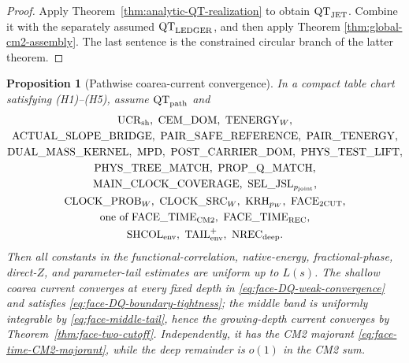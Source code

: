 \documentclass[11pt]{article}
\newtheorem{proposition}[theorem]{Proposition}
\begin{document}
\begin{proof}
Apply Theorem~\ref{thm:analytic-QT-realization} to obtain
$\mathrm{QT}_{\rm JET}$.  Combine it with the separately assumed
$\mathrm{QT}_{\rm LEDGER}$, and then apply Theorem
\ref{thm:global-cm2-assembly}.  The last sentence is the constrained
circular branch of the latter theorem.
\end{proof}

\begin{proposition}[Pathwise coarea-current convergence]
\label{prop:common-refinement-majorant}
In a compact table chart satisfying \textup{(H1)--(H5)}, assume
$\mathrm{QT}_{\rm path}$ and
\[
\begin{gathered}
 \mathrm{UCR}_{\rm sh},\ \mathrm{CEM\_DOM},\ \mathrm{TENERGY}_{W},\\
 \mathrm{ACTUAL\_SLOPE\_BRIDGE},\ \mathrm{PAIR\_SAFE\_REFERENCE},\
 \mathrm{PAIR\_TENERGY},\\
 \mathrm{DUAL\_MASS\_KERNEL},\ \mathrm{MPD},\
 \mathrm{POST\_CARRIER\_DOM},\ \mathrm{PHYS\_TEST\_LIFT},\\
 \mathrm{PHYS\_TREE\_MATCH},\ \mathrm{PROP\_Q\_MATCH},\\
 \mathrm{MAIN\_CLOCK\_COVERAGE},\
 \mathrm{SEL\_JSL}_{p_{\rm joint}},\\
 \mathrm{CLOCK\_PROB}_{W},\ \mathrm{CLOCK\_SRC}_{W},\
 \mathrm{KRH}_{p_W},\ \mathrm{FACE}_{\rm 2CUT},\\
 \text{one of }\mathrm{FACE\_TIME}_{\rm CM2},\
 \mathrm{FACE\_TIME}_{\rm REC},\\
 \mathrm{SHCOL}_{\rm env},\ \mathrm{TAIL}_{\rm env}^{+},\
 \mathrm{NREC}_{\rm deep}.
\end{gathered}
\]
Then all constants in the
functional-correlation, native-energy, fractional-phase, direct-$Z$, and
parameter-tail estimates are uniform up to $L(s)$.  The shallow coarea current
converges at every fixed depth in
\eqref{eq:face-DQ-weak-convergence} and satisfies
\eqref{eq:face-DQ-boundary-tightness}; the middle band is uniformly
integrable by \eqref{eq:face-middle-tail}, hence the growing-depth current
converges by Theorem~\ref{thm:face-two-cutoff}.  Independently, it has the
CM2 majorant \eqref{eq:face-time-CM2-majorant}, while the deep
remainder is $o(1)$ in the CM2 sum.
\end{proposition}
\end{document}
